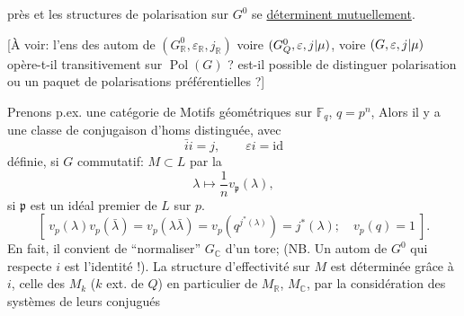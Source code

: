 près et les structures de polarisation sur $G^0$ se \uline{déterminent mutuellement}.

 [À voir: l'ens des autom de $(G^0_{\mathbb R},\varepsilon_{\mathbb R},j_{\mathbb R})$ voire $(G^0_{{Q}},\varepsilon,{j|\mu})$, voire $(G,\varepsilon,{j|\mu})$ opère-t-il transitivement sur $\operatorname{Pol}(G)$ ?  est-il possible  de distinguer    polarisation ou un paquet de polarisations préférentielles ?]

Prenons p.ex. une catégorie de Motifs géométriques sur $\mathbb F_q$, $q=p^n$,  Alors  il y a une classe de conjugaison d'homs
distinguée, avec
\[
\bar i i=j,\qquad\varepsilon i=\mathrm{id}
\]
définie,  si $G$ commutatif: $M\subset L$  par la
\[
\lambda\longmapsto\frac1n v_{\mathfrak p}(\lambda),
\]
si $\mathfrak p$ est un idéal premier de $L$ sur $p$.
\[
[\ v_p(\lambda)v_p(\bar\lambda)=v_p(\lambda\bar\lambda)=v_p(q^{j^*(\lambda)})=j^*(\lambda);\quad v_p(q)=1\ ].
\]
En fait, il convient de ``normaliser'' $G_{\mathbb C}$   d'un tore; (NB. Un autom de $G^0$ qui  respecte $i$ est l'identité !). La structure d'effectivité sur $M$ est déterminée grâce à $i$, celle des $M_k$ ($k$ ext. de $Q$) en particulier de $M_{\mathbb R}$, $M_{\mathbb C}$, par la considération des systèmes de leurs conjugués

